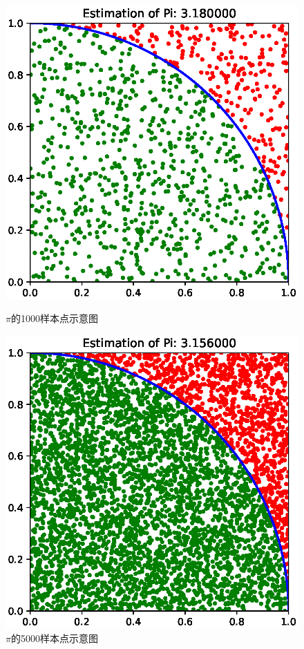 \documentclass[12pt,a4paper]{article}%
\begin{document}
\begin{figure}[H]%
    \centering
    \begin{minipage}{0.48\textwidth}
        \centering
        \includegraphics[width=1.1\textwidth]{pi_estimate_1000.eps}
        \caption{\fontsize{10pt}{15pt}\selectfont $\pi$的1000样本点示意图}
    \end{minipage}
    \hspace{0cm}%
    \hfill%
    \begin{minipage}{0.48\textwidth}
        \centering
        \includegraphics[width=1.1\textwidth]{pi_estimate_5000.eps}
        \caption{\fontsize{10pt}{15pt}\selectfont $\pi$的5000样本点示意图}
    \end{minipage}\label{fig:figure2}
\end{figure}
\end{document}
